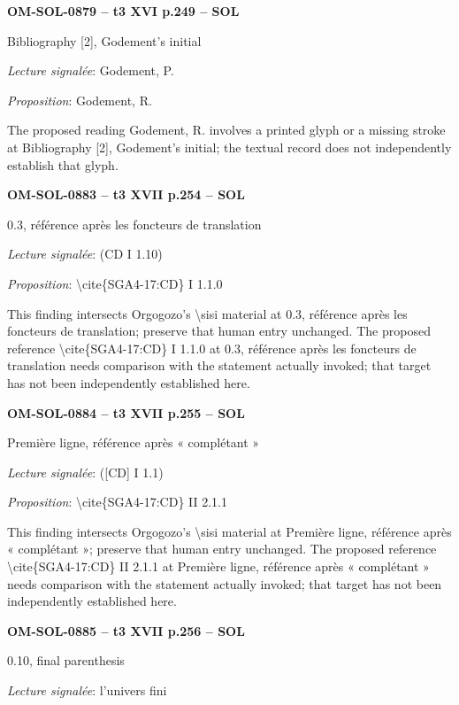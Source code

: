 \par\noindent\textbf{OM-SOL-0879 -- t3 XVI p.249 -- SOL}\par
Bibliography [2], Godement's initial\par
\emph{Lecture signalée}: Godement, P.\par
\emph{Proposition}: Godement, R.\par
The proposed reading Godement, R. involves a printed glyph or a missing stroke at Bibliography [2], Godement's initial; the textual record does not independently establish that glyph.\par
\par\noindent\textbf{OM-SOL-0883 -- t3 XVII p.254 -- SOL}\par
0.3, référence après les foncteurs de translation\par
\emph{Lecture signalée}: (CD I 1.10)\par
\emph{Proposition}: \textbackslash{}cite\{SGA4-17:CD\} I 1.1.0\par
This finding intersects Orgogozo's \textbackslash{}sisi material at 0.3, référence après les foncteurs de translation; preserve that human entry unchanged. The proposed reference \textbackslash{}cite\{SGA4-17:CD\} I 1.1.0 at 0.3, référence après les foncteurs de translation needs comparison with the statement actually invoked; that target has not been independently established here.\par
\par\noindent\textbf{OM-SOL-0884 -- t3 XVII p.255 -- SOL}\par
Première ligne, référence après « complétant »\par
\emph{Lecture signalée}: ([CD] I 1.1)\par
\emph{Proposition}: \textbackslash{}cite\{SGA4-17:CD\} II 2.1.1\par
This finding intersects Orgogozo's \textbackslash{}sisi material at Première ligne, référence après « complétant »; preserve that human entry unchanged. The proposed reference \textbackslash{}cite\{SGA4-17:CD\} II 2.1.1 at Première ligne, référence après « complétant » needs comparison with the statement actually invoked; that target has not been independently established here.\par
\par\noindent\textbf{OM-SOL-0885 -- t3 XVII p.256 -- SOL}\par
0.10, final parenthesis\par
\emph{Lecture signalée}: l'univers fini\par
